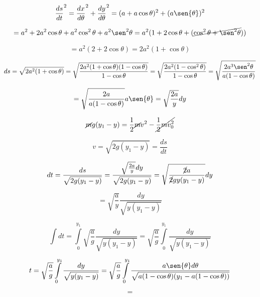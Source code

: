 \documentclass[12pt,a4paper]{article}
\begin{document}
\begin{equation*}
    \frac{ds}{dt} ^2 = \frac{d x}{d \theta} ^2 + \frac{d y}{ d \theta} ^2 = (a + a \cos{\theta})^2 + (a \sen{\theta})^2
\end{equation*}

\begin{equation*}
    = a^2 + 2a^2 \cos{\theta} + a^2 \cos^2{\theta} + a^2 \sen^2{\theta} = a^2 (1+ 2 \cos{\theta} + (\cancel{\cos^2{\theta} + \sen^2{\theta}})) 
\end{equation*}

\begin{equation*}
    = a^2 (2 + 2 \cos{\theta})  = 2 a^2 (1 + \cos{\theta})
\end{equation*}

\begin{equation*}
    ds = \sqrt{ 2 a^2(1 + \cos{\theta})} = \sqrt{\frac{2 a^2 (1+ \cos{\theta})( 1 - \cos{\theta})}{1- \cos{\theta}}}= \sqrt{\frac{2 a^2 (1 - \cos^2{\theta})}{1- \cos{\theta}}} = \sqrt{\frac{2 a^3 \sen^2{ \theta}}{a (1- \cos{\theta})}} 
\end{equation*}

\begin{equation*}
    = \sqrt{\frac{2a}{a (1- \cos{\theta})}} a \sen{\theta} = \sqrt{\frac{2a}{y}} dy
\end{equation*}

\begin{equation*}
    \cancel{m}g(y_1-y) = \frac{1}{2} \cancel{m} v^2 - \cancel{\frac{1}{2} m v_0 ^2} 
\end{equation*}

\begin{equation*}
    v = \sqrt{2g (y_1 - y)} = \frac{ds}{dt}
\end{equation*}

\begin{equation*}
     dt = \frac{ds}{\sqrt{2g(y_1 - y)}} = \frac{\sqrt{\frac{2a}{y}} dy}{\sqrt{2g(y_1 - y)}}= \sqrt{\frac{\cancel{2}a}{\cancel{2} g y (y_1 - y)}} dy
\end{equation*}

\begin{equation*}
    = \sqrt{\frac{a}{y}} \frac{dy}{\sqrt{y (y_1 - y)}}
\end{equation*}

\begin{equation*}
    \int dt = \int \limits_{0}^{y_1} \sqrt{\frac{a}{g}} \frac{dy}{\sqrt{y (y_1 - y)}} = \sqrt{\frac{a}{g}} \int \limits_{0}^{y_1} \frac{dy}{\sqrt{y (y_1 - y)}}
\end{equation*}

\begin{equation*}
    t = \sqrt{\frac{a}{g}} \int \limits_{0}^{y_1} \frac{dy}{\sqrt{y (y_1 - y)}} = \sqrt{\frac{a}{g}} \int \limits_{0}^{y_1} \frac{a \sen{\theta} d\theta}{\sqrt{a(1-\cos{\theta}) (y_1 - a(1- \cos{\theta}))}}
\end{equation*}

\begin{equation*}
    = 
\end{equation*}
\end{document}
